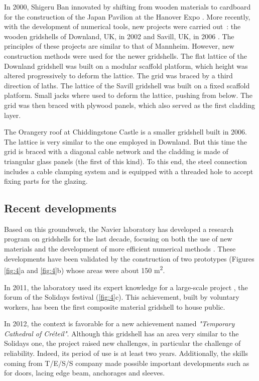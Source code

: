 In 2000, Shigeru Ban innovated by shifting from wooden materials to cardboard for the construction of the Japan Pavilion at the Hanover Expo \cite{McQuaid2006}. More recently, with the development of numerical tools, new projects were carried out~: the wooden gridshells of Downland, UK, in 2002 \cite{Harris2003} and Savill, UK, in 2006 \cite{Harris2008}. The principles of these projects are similar to that of Mannheim. However, new construction methods were used for the newer gridshells. The flat lattice of the Downland gridshell was built on a modular scaffold platform, which height was altered progressively to deform the lattice. The grid was braced by a third direction of laths. The lattice of the Savill gridshell was built on a fixed scaffold platform. Small jacks where used to deform the lattice, pushing from below. The grid was then braced with plywood panels, which also served as the first cladding layer. 

The Orangery roof at Chiddingstone Castle is a smaller gridshell built in 2006. The lattice is very similar to the one employed in Downland. But this time the grid is braced with a diagonal cable network and the cladding is made of triangular glass panels (the first of this kind). To this end, the steel connection includes a cable clamping system and is equipped with a threaded hole to accept fixing parts for the glazing.




\subsection{Recent developments}
Based on this groundwork, the Navier laboratory has developed a research program on gridshells for the last decade, focusing on both the use of new materials and the development of more efficient numerical methods \cite{Douthe2007}. These developments have been validated by the construction of two prototypes (Figures \ref{fig:4}a and \ref{fig:4}b) whose areas were about 150 m\textsuperscript{2}.


In 2011, the laboratory used its expert knowledge for a large-scale project \cite{Baverel2012}, the forum of the Solidays festival (\autoref{fig:4}c). This achievement, built by voluntary workers, has been the first composite material gridshell to house public.

In 2012, the context is favorable for a new achievement named \emph{"Temporary Cathedral of Créteil"}. Although this gridshell has an area very similar to the Solidays one, the project raised new challenges, in particular the challenge of reliability. Indeed, its period of use is at least two years. Additionally, the skills coming from T/E/S/S company made possible important developments such as for doors, lacing edge beam, anchorages and sleeves.

